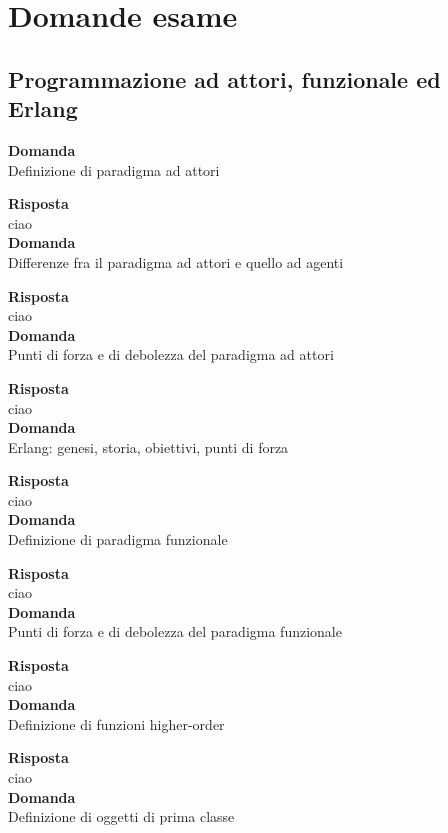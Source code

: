 \documentclass{article}
\begin{document}
\pagestyle{empty}

\section*{Domande esame}
\large

\subsection*{Programmazione ad attori, funzionale ed Erlang}
\textbf{Domanda}\\
Definizione di paradigma ad attori

\textbf{Risposta}\\
ciao
\vspace{14pt}\\
\textbf{Domanda}\\
Differenze fra il paradigma ad attori e quello ad agenti

\textbf{Risposta}\\
ciao
\vspace{14pt}\\
\textbf{Domanda}\\
Punti di forza e di debolezza del paradigma ad attori

\textbf{Risposta}\\
ciao
\vspace{14pt}\\
\textbf{Domanda}\\
Erlang: genesi, storia, obiettivi, punti di forza

\textbf{Risposta}\\
ciao
\vspace{14pt}\\
\textbf{Domanda}\\
Definizione di paradigma funzionale

\textbf{Risposta}\\
ciao
\vspace{14pt}\\
\textbf{Domanda}\\
Punti di forza e di debolezza del paradigma funzionale

\textbf{Risposta}\\
ciao
\vspace{14pt}\\
\textbf{Domanda}\\
Definizione di funzioni higher-order

\textbf{Risposta}\\
ciao
\vspace{14pt}\\
\textbf{Domanda}\\
Definizione di oggetti di prima classe
\end{document}
